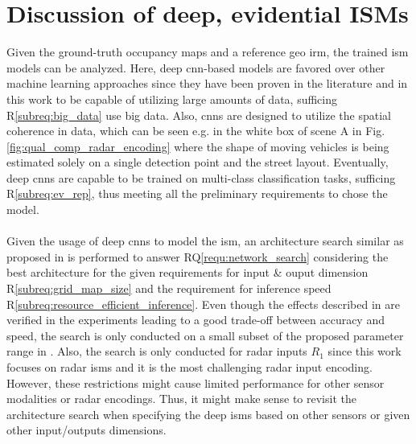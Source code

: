 \section{Discussion of deep, evidential ISMs}
\label{sec:disc_deep_ev_isms}
Given the ground-truth occupancy maps and a reference geo \gls{irm}, the trained \gls{ism} models can be analyzed. Here, deep \gls{cnn}-based models are favored over other machine learning approaches since they have been proven in the literature and in this work to be capable of utilizing large amounts of data, sufficing R\ref{subreq:big_data} use big data. Also, \gls{cnn}s are designed to utilize the spatial coherence in data, which can be seen e.g. in the white box of scene A in Fig. \ref{fig:qual_comp_radar_encoding} where the shape of moving vehicles is being estimated solely on a single detection point and the street layout. Eventually, deep \gls{cnn}s are capable to be trained on multi-class classification tasks, sufficing R\ref{subreq:ev_rep}, thus meeting all the preliminary requirements to chose the model.
\\\\
Given the usage of deep \gls{cnn}s to model the \gls{ism}, an architecture search similar as proposed in \cite{radosavovic2020designing} is performed to answer RQ\ref{requ:network_search} considering the best architecture for the given requirements for input \& ouput dimension R\ref{subreq:grid_map_size} and the requirement for inference speed R\ref{subreq:resource_efficient_inference}. Even though the effects described in \cite{radosavovic2020designing} are verified in the experiments leading to a good trade-off between accuracy and speed, the search is only conducted on a small subset of the proposed parameter range in \cite{radosavovic2020designing}. Also, the search is only conducted for radar inputs $R_1$ since this work focuses on radar \gls{ism}s and it is the most challenging radar input encoding. However, these restrictions might cause limited performance for other sensor modalities or radar encodings. Thus, it might make sense to revisit the architecture search when specifying the deep \gls{ism}s based on other sensors or given other input/outputs dimensions.
\\\\
